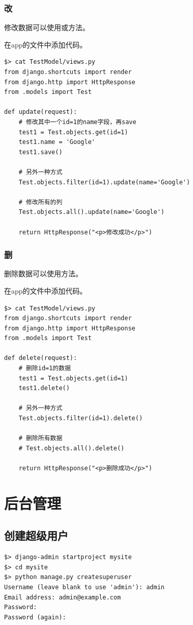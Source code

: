 \subsubsection{改}
修改数据可以使用或方法。

在app的文件中添加代码。
\begin{lstlisting}[style=demostyle,numbers=none]
$> cat TestModel/views.py
from django.shortcuts import render
from django.http import HttpResponse
from .models import Test

def update(request):
    # 修改其中一个id=1的name字段，再save
    test1 = Test.objects.get(id=1)
    test1.name = 'Google'
    test1.save()

    # 另外一种方式
    Test.objects.filter(id=1).update(name='Google')

    # 修改所有的列
    Test.objects.all().update(name='Google')

    return HttpResponse("<p>修改成功</p>")
\end{lstlisting}

\subsubsection{删}
删除数据可以使用方法。

在app的文件中添加代码。
\begin{lstlisting}[style=demostyle,numbers=none]
$> cat TestModel/views.py
from django.shortcuts import render
from django.http import HttpResponse
from .models import Test

def delete(request):
    # 删除id=1的数据
    test1 = Test.objects.get(id=1)
    test1.delete()

    # 另外一种方式
    Test.objects.filter(id=1).delete()

    # 删除所有数据
    # Test.objects.all().delete()

    return HttpResponse("<p>删除成功</p>")
\end{lstlisting}




\section{后台管理}
\subsection{创建超级用户}
\begin{lstlisting}[style=demostyle,numbers=none]
$> django-admin startproject mysite
$> cd mysite
$> python manage.py createsuperuser
Username (leave blank to use 'admin'): admin
Email address: admin@example.com
Password:
Password (again):
\end{lstlisting}

